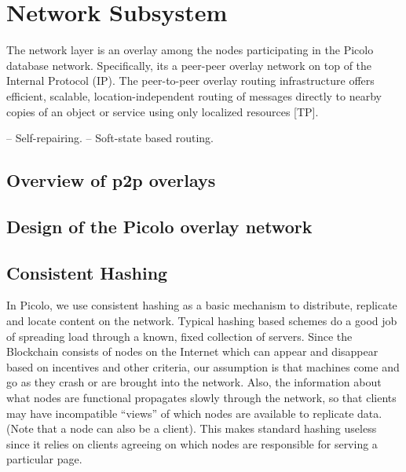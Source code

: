 \section{Network Subsystem} 

The network layer is an overlay among the nodes participating in the Picolo database network. Specifically, its a peer-peer overlay network
on top of the Internal Protocol (IP). The peer-to-peer overlay routing infrastructure offers efficient, scalable, location-independent
routing of messages directly to nearby copies of an object or service using only localized resources [TP].

-- Self-repairing.
-- Soft-state based routing.

\subsection{Overview of p2p overlays}

\subsection{Design of the Picolo overlay network}

\subsection{Consistent Hashing} 

In Picolo, we use consistent hashing as a basic mechanism to distribute, replicate and locate content on the network.
Typical hashing based schemes do a good job of spreading load through a known, fixed collection of servers. Since the
Blockchain consists of nodes on the Internet which can appear and disappear based on incentives and other criteria, our
assumption is that machines come and go as they crash or are brought into the network. Also,
the information about what nodes are functional propagates slowly through the
network, so that clients may have incompatible “views” of which nodes are available to replicate data. (Note that a
node can also be a client). This makes standard hashing useless since it relies on clients agreeing on which nodes are responsible for serving a particular
page.


